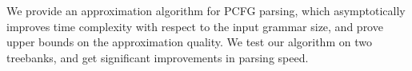 We provide an approximation algorithm for PCFG parsing, which asymptotically improves time complexity with respect to the input grammar size, and prove
 upper bounds on the approximation quality. We test our algorithm on two
 treebanks, and get significant improvements in parsing speed.

